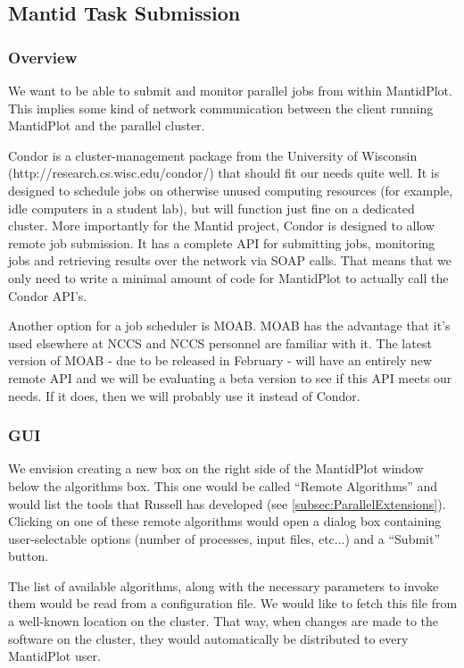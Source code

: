 \subsection{Mantid Task Submission}
\subsubsection{Overview}
We want to be able to submit and monitor parallel jobs from within MantidPlot.  This implies some kind of network communication between the client running MantidPlot and the parallel cluster.

Condor is a cluster-management package from the University of Wisconsin (http://research.cs.wisc.edu/condor/) that should fit our needs quite well.  It is designed to schedule jobs on otherwise unused computing resources (for example, idle computers in a student lab), but will function just fine on a dedicated cluster.  More importantly for the Mantid project, Condor is designed to allow remote job submission.  It has a complete API for submitting jobs, monitoring jobs and retrieving results over the network via SOAP calls.  That means that we only need to write a minimal amount of code for MantidPlot to actually call the Condor API's.

Another option for a job scheduler is MOAB.  MOAB has the advantage that it's used elsewhere at NCCS and NCCS personnel are familiar with it.   The latest version of MOAB - due to be released in February - will have an entirely new remote API and we will be evaluating a beta version to see if this API meets our needs.  If it does, then we will probably use it instead of Condor.  


\subsubsection{GUI}
\label{subsubsec:GUI}
We envision creating a new box on the right side of the MantidPlot window below the algorithms box.  This one would be called ``Remote Algorithms'' and would list the tools that Russell has developed (see \ref{subsec:ParallelExtensions}).  Clicking on one of these remote algorithms would open a dialog box containing user-selectable options (number of processes, input files, etc...) and a ``Submit'' button.

The list of available algorithms, along with the necessary parameters to invoke them would be read from a configuration file.  We would like to fetch this file from a well-known location on the cluster.  That way, when changes are made to the software on the cluster, they would automatically be distributed to every MantidPlot user.

